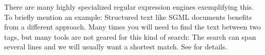 There are many highly specialized regular expression engines
exemplifying this. To briefly mention an example: Structured text like
SGML documents benefits from a different approach. Many times you will
need to find the text between two tags, but many tools are not geared
for this kind of search: The search can span several lines and we will
usually want a shortest match. See \cite{pedersen2010} for details.


